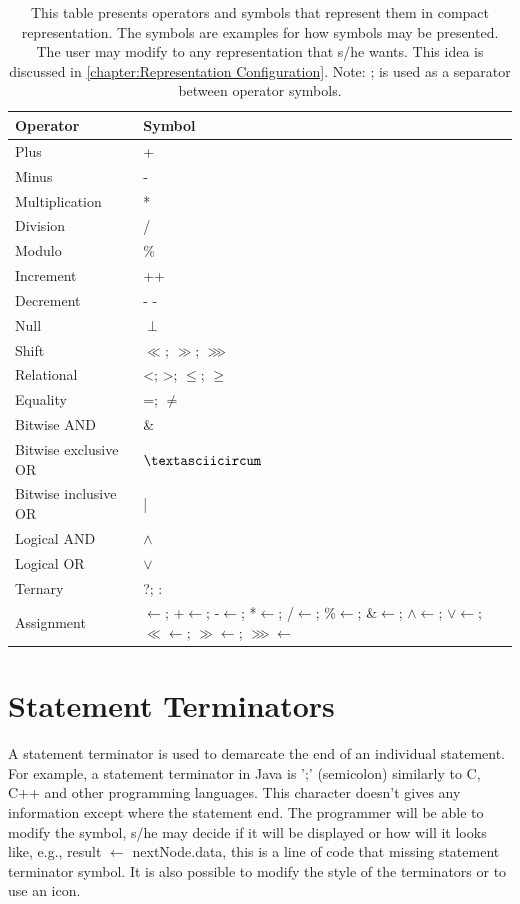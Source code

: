 \begin{table}[H]
\centering
\begin{tabular}{|l|l|}
\hline
{\bf Operator} & {\bf Symbol} \\ \hline
Plus & + \\ \hline
Minus & - \\ \hline
Multiplication & * \\ \hline
Division & / \\ \hline
Modulo & \% \\ \hline
Increment & ++ \\ \hline
Decrement & - - \\ \hline
Null & $ \perp $ \\ \hline
Shift & $ \ll $; $ \gg $; $ \ggg $ \\ \hline
Relational & <; >; $ \leq $; $ \geq $ \\ \hline
Equality & =; $ \neq $ \\ \hline
Bitwise AND & \& \\ \hline
Bitwise exclusive OR & $ \textasciicircum $ \\ \hline
Bitwise inclusive OR & | \\ \hline
Logical AND & $ \wedge $  \\ \hline
Logical OR & $ \vee $  \\ \hline
Ternary & ?; : \\ \hline
Assignment & $ \longleftarrow $; +$ \longleftarrow $; -$ \longleftarrow $; *$ \longleftarrow $; /$ \longleftarrow $; \%$ \longleftarrow $; \&$ \longleftarrow $; $ \wedge $$ \longleftarrow $; $ \vee $$ \longleftarrow $; $ \ll $$ \longleftarrow $; $ \gg $$ \longleftarrow $; $ \ggg $$ \longleftarrow $\\ \hline
\end{tabular}
\caption{This table presents operators and symbols that represent them in compact representation. The symbols are examples for how symbols may be presented. The user may modify to any representation that s/he wants. This idea is discussed in \autoref{chapter:Representation Configuration}. Note: ; is used as a separator between operator symbols.}
\end{table}
\section{Statement Terminators}
A statement terminator is used to demarcate the end of an individual statement. For example, a statement terminator in Java is ';' (semicolon) similarly to C, C++ and other programming languages. This character doesn't gives any information except where the statement end. The programmer will be able to modify the symbol, s/he may decide if it will be displayed or how will it looks like, e.g., result $ \longleftarrow $ nextNode.data, this is a line of code that missing statement terminator symbol. It is also possible to modify the style of the terminators or to use an icon.

